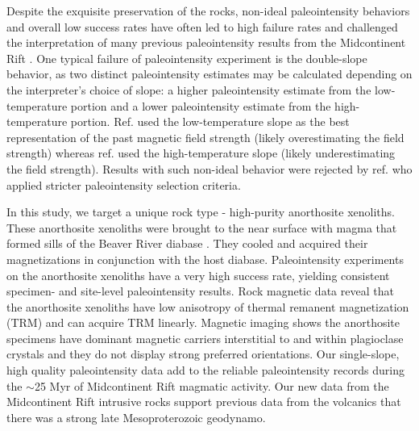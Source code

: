 \documentclass[9pt,twocolumn,twoside,lineno]{pnas-new}
\begin{document}
Despite the exquisite preservation of the rocks, non-ideal paleointensity behaviors and overall low success rates have often led to high failure rates and challenged the interpretation of many previous paleointensity results from the Midcontinent Rift \cite{Pesonen1983a, Kulakov2013a}. One typical failure of paleointensity experiment is the double-slope behavior, as two distinct paleointensity estimates may be calculated depending on the interpreter's choice of slope: a higher paleointensity estimate from the low-temperature portion and a lower paleointensity estimate from the high-temperature portion. Ref. \citealp{Pesonen1983a} used the low-temperature slope as the best representation of the past magnetic field strength (likely overestimating the field strength) whereas ref. \citealp{Kulakov2013a} used the high-temperature slope (likely underestimating the field strength). Results with such non-ideal behavior were rejected by ref. \citealp{Sprain2018a} who applied stricter paleointensity selection criteria.

In this study, we target a unique rock type - high-purity anorthosite xenoliths. These anorthosite xenoliths were brought to the near surface with magma that formed sills of the Beaver River diabase \cite{Zhang2021b}. They cooled and acquired their magnetizations in conjunction with the host diabase. Paleointensity experiments on the anorthosite xenoliths have a very high success rate, yielding consistent specimen- and site-level paleointensity results. Rock magnetic data reveal that the anorthosite xenoliths have low anisotropy of thermal remanent magnetization (TRM) and can acquire TRM linearly. Magnetic imaging shows the anorthosite specimens have dominant magnetic carriers interstitial to and within plagioclase crystals and they do not display strong preferred orientations. Our single-slope, high quality paleointensity data add to the reliable paleointensity records during the $\sim$25 Myr of Midcontinent Rift magmatic activity. Our new data from the Midcontinent Rift intrusive rocks support previous data from the volcanics that there was a strong late Mesoproterozoic geodynamo.

\end{document}
